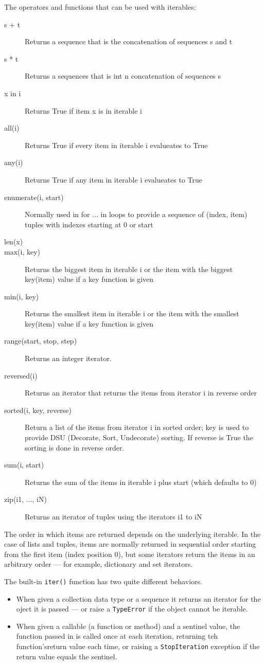 The operators and functions that can be used with iterables:
\begin{description}
\item[s + t] Returns a sequence that is the concatenation of sequences s and t
\item[s * t] Returns a sequences that is int n concatenation of sequences s
\item[x in i] Returns True if item x is in iterable i
\item[all(i)] Returns True if every item in iterable i evalueates to True
\item[any(i)] Returns True if any item in iterable i evalueates to True
\item[enumerate(i, start)] Normally used in for ... in loops to provide a sequence of (index, item) tuples with indexes starting at 0 or start
\item[len(x)] 
\item[max(i, key)] Returns the biggest item in iterable i or the item with the biggest key(item) value if a key function is given
\item[min(i, key)] Returns the smallest item in iterable i or the item with the smallest key(item) value if a key function is given
\item[range(start, stop, step)] Returns an integer iterator.
\item[reversed(i)] Returns an iterator that returns the items from iterator i in reverse order
\item[sorted(i, key, reverse)] Return a list of the items from iterator i in sorted order; key is used to provide DSU (Decorate, Sort, Undecorate) sorting. If reverse is True the sorting is done in reverse order.
\item[sum(i, start)] Returns the sum of the items in iterable i plus start (which defaults to 0)
\item[zip(i1, ..., iN)] Returns an iterator of tuples using the iterators i1 to iN
\end{description}


The order in which items are returned depends on the underlying iterable.
In the case of lists and tuples, items are normally returned in sequential order starting from the first item (index position 0), but some iterators return the items in an arbitrary order --- for example, dictionary and set iterators.


The built-in \verb|iter()| function has two quite different behaviors.
\begin{itemize}
\item When given a collection data type or a sequence it returns an iterator for the oject it is passed --- or raise a \verb|TypeError| if the object cannot be iterable.
\item When given a callable (a function or method) and a sentinel value, the function passed in is called once at each iteration, returning teh function'sreturn value each time, or raising a \verb|StopIteration| exception if the return value equals the sentinel.
\end{itemize}




